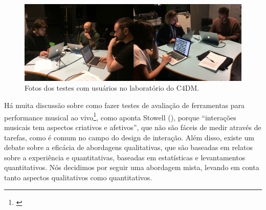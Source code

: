 \begin{figure}

\includegraphics[width=1\textwidth]{pictures/cap4/usertest}
\caption{\label{usertest}Fotos dos testes com usuários no laboratório do C4DM.}
\end{figure}


Há muita discussão sobre como fazer testes de avaliação de ferramentas para performance musical ao vivo\footnote{\cite{Barbosa2015}}, como aponta Stowell (\citeyear{Stowell}), porque ``interações musicais tem aspectos criativos e afetivos'', que não são fáceis de medir através de tarefas, como é comum no campo do design de interação. Além disso, existe um debate sobre a eficácia de abordagens qualitativas, que são baseadas em relatos sobre a experiência e quantitativas, baseadas em estatísticas e levantamentos quantitativos. Nós decidimos por seguir uma abordagem mista, levando em conta tanto aspectos qualitativos como quantitativos.

